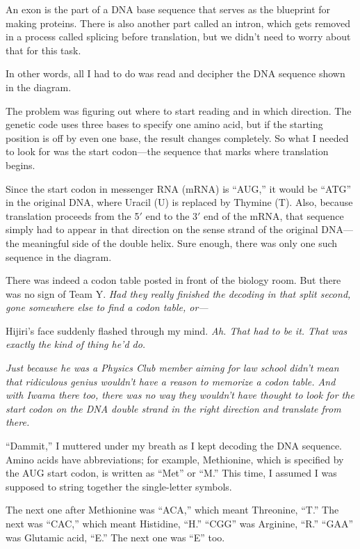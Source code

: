\documentclass[
    a4paper,
    12pt,
    twoside,
    openany,
    UTF8,
    fontset=windows
]{ctexbook}
\begin{document}
An exon is the part of a DNA base sequence that serves as the blueprint for making proteins. There is also another part called an intron, which gets removed in a process called splicing before translation, but we didn't need to worry about that for this task.

In other words, all I had to do was read and decipher the DNA sequence shown in the diagram.

The problem was figuring out where to start reading and in which direction. The genetic code uses three bases to specify one amino acid, but if the starting position is off by even one base, the result changes completely. So what I needed to look for was the start codon---the sequence that marks where translation begins.

Since the start codon in messenger RNA (mRNA) is ``AUG,'' it would be ``ATG'' in the original DNA, where Uracil (U) is replaced by Thymine (T). Also, because translation proceeds from the 5$'$ end to the 3$'$ end of the mRNA, that sequence simply had to appear in that direction on the sense strand of the original DNA---the meaningful side of the double helix. Sure enough, there was only one such sequence in the diagram.

There was indeed a codon table posted in front of the biology room. But there was no sign of Team Y. \textit{Had they really finished the decoding in that split second, gone somewhere else to find a codon table, or---}

Hijiri's face suddenly flashed through my mind. \textit{Ah. That had to be it. That was exactly the kind of thing he'd do.}

\textit{Just because he was a Physics Club member aiming for law school didn't mean that ridiculous genius wouldn't have a reason to memorize a codon table. And with Iwama there too, there was no way they wouldn't have thought to look for the start codon on the DNA double strand in the right direction and translate from there.}

``Dammit,'' I muttered under my breath as I kept decoding the DNA sequence. Amino acids have abbreviations; for example, Methionine, which is specified by the AUG start codon, is written as ``Met'' or ``M.'' This time, I assumed I was supposed to string together the single-letter symbols.

The next one after Methionine was ``ACA,'' which meant Threonine, ``T.'' The next was ``CAC,'' which meant Histidine, ``H.'' ``CGG'' was Arginine, ``R.'' ``GAA'' was Glutamic acid, ``E.'' The next one was ``E'' too.
\end{document}
